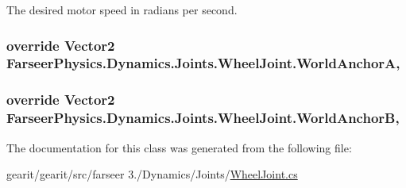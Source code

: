 The desired motor speed in radians per second. 

\hypertarget{class_farseer_physics_1_1_dynamics_1_1_joints_1_1_wheel_joint_a6b404d403999f8a84f0afb2bd1da35b6}{
\subsubsection[{World\+Anchor\+A}]{\setlength{\rightskip}{0pt plus 5cm}override Vector2 Farseer\+Physics.\+Dynamics.\+Joints.\+Wheel\+Joint.\+World\+Anchor\+A\hspace{0.3cm}{\ttfamily [get]}, {\ttfamily [set]}}}\label{class_farseer_physics_1_1_dynamics_1_1_joints_1_1_wheel_joint_a6b404d403999f8a84f0afb2bd1da35b6}
\hypertarget{class_farseer_physics_1_1_dynamics_1_1_joints_1_1_wheel_joint_a47212bee3d4a6f2bd79d80a1b6898fba}{
\subsubsection[{World\+Anchor\+B}]{\setlength{\rightskip}{0pt plus 5cm}override Vector2 Farseer\+Physics.\+Dynamics.\+Joints.\+Wheel\+Joint.\+World\+Anchor\+B\hspace{0.3cm}{\ttfamily [get]}, {\ttfamily [set]}}}\label{class_farseer_physics_1_1_dynamics_1_1_joints_1_1_wheel_joint_a47212bee3d4a6f2bd79d80a1b6898fba}


The documentation for this class was generated from the following file\+:\begin{DoxyCompactItemize}
\item 
gearit/gearit/src/farseer 3./\+Dynamics/\+Joints/\hyperlink{_wheel_joint_8cs}{Wheel\+Joint.\+cs}\end{DoxyCompactItemize}
